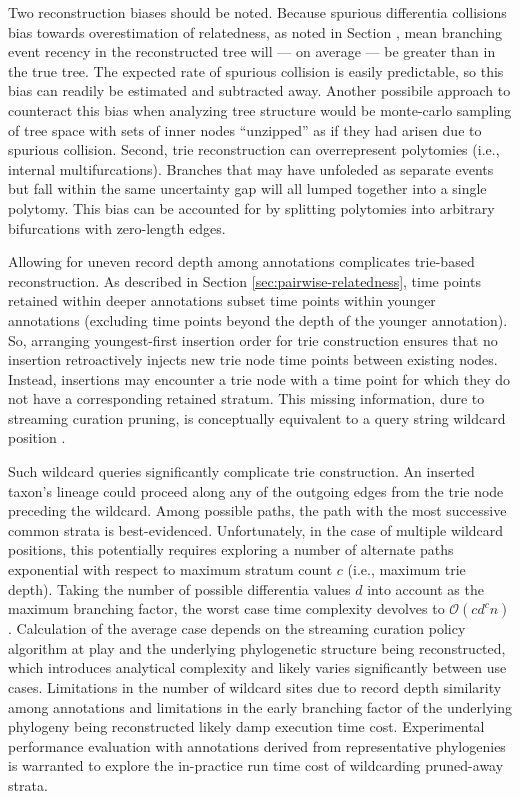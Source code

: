 Two reconstruction biases should be noted.
Because spurious differentia collisions bias towards overestimation of relatedness, as noted in Section , mean branching event recency in the reconstructed tree will --- on average --- be greater than in the true tree.
The expected rate of spurious collision is easily predictable, so this bias can readily be estimated and subtracted away.
Another possibile approach to counteract this bias when analyzing tree structure would be monte-carlo sampling of tree space with sets of inner nodes ``unzipped'' as if they had arisen due to spurious collision.
Second, trie reconstruction can overrepresent polytomies (i.e., internal multifurcations).
Branches that may have unfoleded as separate events but fall within the same uncertainty gap will all lumped together into a single polytomy.
This bias can be accounted for by splitting polytomies into arbitrary bifurcations with zero-length edges.

Allowing for uneven record depth among annotations complicates trie-based reconstruction.
As described in Section \ref{sec:pairwise-relatedness}, time points retained within deeper annotations subset time points within younger annotations (excluding time points beyond the depth of the younger annotation).
So, arranging youngest-first insertion order for trie construction ensures that no insertion retroactively injects new trie node time points between existing nodes.
Instead, insertions may encounter a trie node with a time point for which they do not have a corresponding retained stratum.
This missing information, dure to streaming curation pruning, is conceptually equivalent to a query string wildcard position \citep{fukuyama2016partial}.

Such wildcard queries significantly complicate trie construction.
An inserted taxon's lineage could proceed along any of the outgoing edges from the trie node preceding the wildcard.
Among possible paths, the path with the most successive common strata is best-evidenced.
Unfortunately, in the case of multiple wildcard positions, this  potentially requires exploring a number of alternate paths exponential with respect to maximum stratum count $c$ (i.e., maximum trie depth).
Taking the number of possible differentia values $d$ into account as the maximum branching factor, the worst case time complexity devolves to $\mathcal{O}(c d^c n)$ \citep{fukuyama2016partial}.
Calculation of the average case depends on the streaming curation policy algorithm at play and the underlying phylogenetic structure being reconstructed, which introduces analytical complexity and likely varies significantly between use cases.
Limitations in the number of wildcard sites due to record depth similarity among annotations and limitations in the early branching factor of the underlying phylogeny being reconstructed likely damp execution time cost.
Experimental performance evaluation with annotations derived from representative phylogenies is warranted to explore the in-practice run time cost of wildcarding pruned-away strata.



